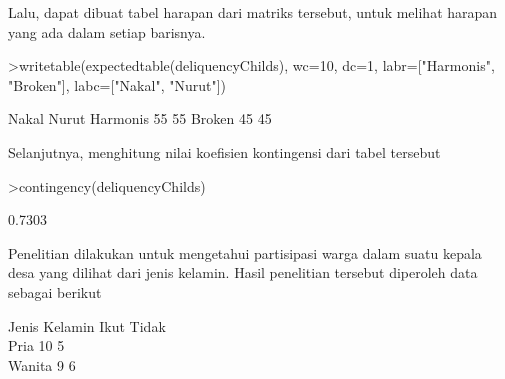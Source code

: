 \documentclass[a4paper,10pt]{article}
\begin{document}
\begin{eulernotebook}
\begin{eulercomment}
\begin{eulercomment}
\begin{eulercomment}
\begin{eulercomment}
\begin{eulercomment}
\begin{eulercomment}
\begin{eulercomment}
Lalu, dapat dibuat tabel harapan dari matriks tersebut, untuk melihat
harapan yang ada dalam setiap barisnya.
\end{eulercomment}
\begin{eulerprompt}
>writetable(expectedtable(deliquencyChilds), wc=10, dc=1, labr=["Harmonis", "Broken"], labc=["Nakal", "Nurut"])
\end{eulerprompt}
\begin{euleroutput}
                 Nakal     Nurut
    Harmonis        55        55
      Broken        45        45
\end{euleroutput}
\begin{eulercomment}
Selanjutnya, menghitung nilai koefisien kontingensi dari tabel
tersebut
\end{eulercomment}
\begin{eulerprompt}
>contingency(deliquencyChilds)
\end{eulerprompt}
\begin{euleroutput}
  0.7303
\end{euleroutput}
\begin{eulercomment}
Penelitian dilakukan untuk mengetahui partisipasi warga dalam suatu
kepala desa yang dilihat dari jenis kelamin. Hasil penelitian tersebut
diperoleh data sebagai berikut

Jenis Kelamin \textbar{} Ikut \textbar{} Tidak\\
Pria          \textbar{} 10   \textbar{} 5\\
Wanita        \textbar{} 9    \textbar{} 6


\end{eulercomment}
\end{eulercomment}
\end{eulercomment}
\end{eulercomment}
\end{eulercomment}
\end{eulercomment}
\end{eulercomment}
\end{eulernotebook}
\end{document}
